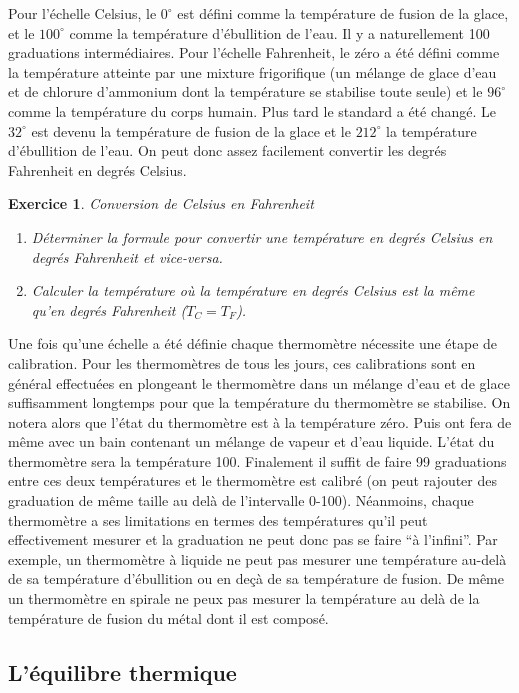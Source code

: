 \documentclass[a4paper,12pt]{book}
\newtheorem{exercice}{Exercice}
\begin{document}
Pour l'échelle Celsius, le $0^\circ$ est défini comme la température de fusion de la glace, et le $100^\circ$ comme la température
d'ébullition de l'eau. Il y a naturellement 100 graduations intermédiaires. Pour l'échelle Fahrenheit, le zéro a été défini comme la température
atteinte par une mixture frigorifique (un mélange de glace d'eau et de chlorure d'ammonium dont la température se stabilise toute seule)
et le $96^\circ$ comme la température du corps humain. Plus tard le standard a été changé. Le $32^\circ$ est devenu la température de
fusion de la glace et le $212^\circ$ la température d'ébullition de l'eau. On peut donc assez facilement convertir les degrés Fahrenheit en 
degrés Celsius.
\begin{exercice}{Conversion de Celsius en Fahrenheit}

\begin{enumerate}
\item Déterminer la formule pour convertir une température en degrés Celsius en degrés Fahrenheit et vice-versa.
\item Calculer la température où la température en degrés Celsius est la même qu'en degrés Fahrenheit ($T_C=T_F$).
\end{enumerate}
\end{exercice}

Une fois qu'une échelle a été définie chaque thermomètre nécessite une étape de calibration. 
Pour les thermomètres de tous les jours, ces calibrations sont 
en général effectuées en plongeant le thermomètre dans un mélange d'eau et de glace suffisamment longtemps pour que 
la température du thermomètre se stabilise. On notera alors que l'état du thermomètre est à la température zéro. Puis 
ont fera de même avec un bain contenant un mélange de vapeur et d'eau liquide. L'état du thermomètre sera la température 100. 
Finalement il suffit de faire 99 graduations entre ces deux températures et le thermomètre est calibré (on peut rajouter des graduation de même taille au delà de l'intervalle 0-100). Néanmoins, chaque thermomètre a ses limitations en termes des températures qu'il peut effectivement mesurer
et la graduation ne peut donc pas se faire ``à l'infini''. Par exemple,
un thermomètre à liquide ne peut pas mesurer une température au-delà de sa température d'ébullition ou en deçà de 
sa température de fusion. De même un thermomètre en spirale ne peux pas mesurer la température au delà de 
la température de fusion du métal dont il est composé.

\subsection{L'équilibre thermique}
\end{document}
